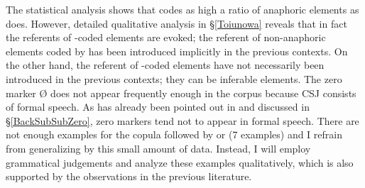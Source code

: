 The statistical analysis shows that
 codes as high a ratio of anaphoric elements as  does.
However, detailed qualitative analysis in \S \ref{Toiunowa} reveals that
in fact the referents of -coded elements are evoked;
the referent of non-anaphoric elements coded by  has been introduced implicitly in the previous contexts.
On the other hand,
the referent of -coded elements have not necessarily been introduced in the previous contexts;
they can be inferable elements.
The zero marker {\O} does not appear frequently enough in the corpus because CSJ consists of formal speech.
As has already been pointed out in  and discussed in \S \ref{BackSubSubZero},
zero markers tend not to appear in formal speech.
There are not enough examples for the copula followed by  or  (7 examples)
and I refrain from generalizing by this small amount of data.
Instead,
I will employ grammatical judgements and analyze these examples qualitatively,
which is also supported by the observations in the previous literature.

